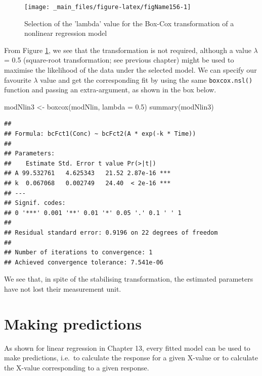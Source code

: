 \documentclass[a4paper,12pt,oneside]{book}
\newenvironment{Shaded}{\begin{snugshade}}{\end{snugshade}}
\newcommand{\FloatTok}[1]{#1}
\newcommand{\OtherTok}[1]{#1}
\newcommand{\FunctionTok}[1]{#1}
\newcommand{\AttributeTok}[1]{#1}
\newcommand{\NormalTok}[1]{#1}
\begin{document}
\begin{figure}

{\centering \texttt{[image: \_main\_files/figure-latex/figName156-1]} 

}

\caption{Selection of the 'lambda' value for the Box-Cox transformation of a nonlinear regression model}\label{fig:figName156}
\end{figure}

From Figure \ref{fig:figName156}, we see that the transformation is not required, although a value \(\lambda\) = 0.5 (square-root transformation; see previous chapter) might be used to maximise the likelihood of the data under the selected model. We can specify our favourite \(\lambda\) value and get the corresponding fit by using the same \texttt{boxcox.nsl()} function and passing an extra-argument, as shown in the box below.

\vspace{12pt}

\begin{Shaded}
\begin{Highlighting}[]
\NormalTok{modNlin3 }\OtherTok{\textless{}{-}} \FunctionTok{boxcox}\NormalTok{(modNlin, }\AttributeTok{lambda =} \FloatTok{0.5}\NormalTok{)}
\FunctionTok{summary}\NormalTok{(modNlin3)}
\end{Highlighting}
\end{Shaded}

\begin{verbatim}
## 
## Formula: bcFct1(Conc) ~ bcFct2(A * exp(-k * Time))
## 
## Parameters:
##    Estimate Std. Error t value Pr(>|t|)    
## A 99.532761   4.625343   21.52 2.87e-16 ***
## k  0.067068   0.002749   24.40  < 2e-16 ***
## ---
## Signif. codes:  
## 0 '***' 0.001 '**' 0.01 '*' 0.05 '.' 0.1 ' ' 1
## 
## Residual standard error: 0.9196 on 22 degrees of freedom
## 
## Number of iterations to convergence: 1 
## Achieved convergence tolerance: 7.541e-06
\end{verbatim}

We see that, in spite of the stabilising transformation, the estimated parameters have not lost their measurement unit.

\hypertarget{making-predictions-1}{%
\section{Making predictions}\label{making-predictions-1}}

As shown for linear regression in Chapter 13, every fitted model can be used to make predictions, i.e.~to calculate the response for a given X-value or to calculate the X-value corresponding to a given response.
\end{document}
